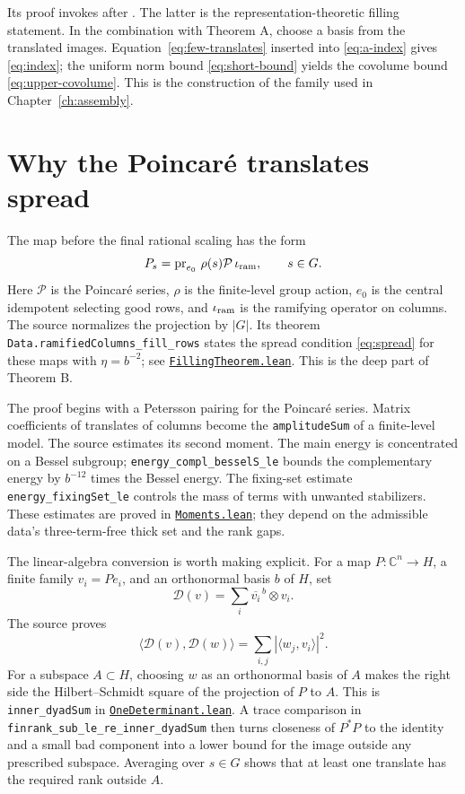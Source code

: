 \documentclass[11pt,oneside,openany]{amsbook}
\theoremstyle{remark}
\numberwithin{equation}{section}
\newcommand{\C}{\mathbb C}
\newcommand{\ghroot}{https://github.com/lsernau/grh-lean/blob/}
\newcommand{\ghrev}{72fead102f663d5c7a407964a13dc0cf9d977207}
\newcommand{\leanfile}[2]{%
  \href{\ghroot\ghrev/grh-compact/src/#1}{\nolinkurl{#2}}}
\begin{document}
Its proof invokes  after
. The latter is the
representation-theoretic filling statement. In the combination
with Theorem A, choose a basis from the translated images.
Equation~\eqref{eq:few-translates} inserted into
\eqref{eq:a-index} gives \eqref{eq:index}; the uniform
norm bound \eqref{eq:short-bound} yields the covolume bound
\eqref{eq:upper-covolume}. This is the construction of the
family used in Chapter~\ref{ch:assembly}.

\section{Why the Poincar\'e translates spread}
\label{sec:filling}
The map before the final rational scaling has the form
\[
P_s=\operatorname{pr}_{e_0}\,\rho(s)
   \mathcal P\,\iota_{\rm ram},\qquad s\in G.
\]
Here $\mathcal P$ is the Poincar\'e series, $\rho$ is
the finite-level group action, $e_0$ is the central
idempotent selecting good rows, and $\iota_{\rm ram}$
is the ramifying operator on columns. The source
normalizes the projection by $|G|$. Its theorem
\texttt{Data.ramifiedColumns\_fill\_rows} states the
spread condition \eqref{eq:spread} for these maps with
$\eta=b^{-2}$; see
\leanfile{New/Filling/FillingTheorem.lean}%
{FillingTheorem.lean}. This is the deep part of Theorem B.

The proof begins with a Petersson pairing for the
Poincar\'e series. Matrix coefficients of translates
of columns become the \texttt{amplitudeSum} of a
finite-level model. The source estimates its second
moment. The main energy is concentrated on a Bessel
subgroup; \texttt{energy\_compl\_besselS\_le}
bounds the complementary energy by $b^{-12}$ times
the Bessel energy. The fixing-set estimate
\texttt{energy\_fixingSet\_le} controls the mass of
terms with unwanted stabilizers. These estimates are
proved in \leanfile{New/Filling/Moments.lean}%
{Moments.lean}; they depend on the admissible data's
three-term-free thick set and the rank gaps.

The linear-algebra conversion is worth making explicit.
For a map $P:\C^n\to H$, a finite family
$v_i=Pe_i$, and an orthonormal basis $b$ of $H$, set
\[
\mathcal D(v)=\sum_i\overline{v_i}^{\,b}\otimes v_i.
\]
The source proves
\begin{equation}
\label{eq:dyad-pairing}
\langle\mathcal D(v),\mathcal D(w)\rangle
 =\sum_{i,j}|\langle w_j,v_i\rangle|^2.
\end{equation}
For a subspace $A\subset H$, choosing $w$ as an
orthonormal basis of $A$ makes the right side the
Hilbert--Schmidt square of the projection of $P$ to
$A$. This is \texttt{inner\_dyadSum} in
\leanfile{New/Heights/OneDeterminant.lean}%
{OneDeterminant.lean}. A trace comparison in
\texttt{finrank\_sub\_le\_re\_inner\_dyadSum}
then turns closeness of $P^*P$ to the identity and a
small bad component into a lower bound for the image
outside any prescribed subspace. Averaging over $s\in G$
shows that at least one translate has the required
rank outside $A$.
\end{document}
